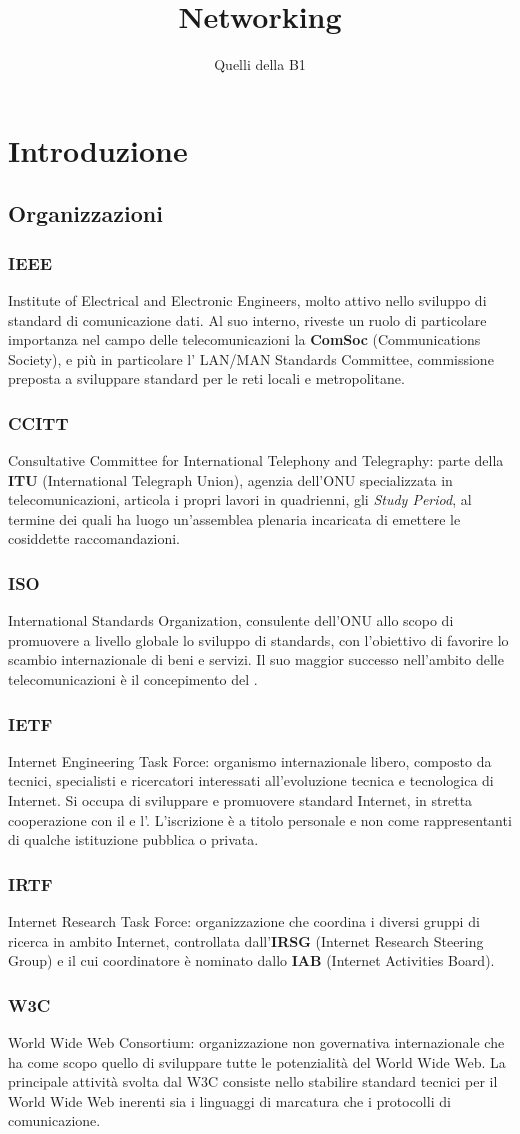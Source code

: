 \documentclass[a4paper,11pt]{article}
\author{Quelli della B1}
\title{Networking}
\def\sub#1{\subsection{#1}\label{#1}}
\def\subsub#1{\subsubsection{#1}\label{#1}}
\def\vedi#1{\nameref{#1}}
\begin{document}
\maketitle
\newpage
\tableofcontents
\newpage

\section*{Introduzione}
\sub{Organizzazioni}
\subsub{IEEE}
Institute of Electrical and Electronic Engineers, molto attivo nello sviluppo di standard di comunicazione dati. Al suo interno, riveste un ruolo di particolare importanza nel campo delle telecomunicazioni la \textbf{ComSoc} (Communications Society), e più in particolare l'\vedi{IEEE 802} LAN/MAN Standards Committee, commissione preposta a sviluppare standard per le reti locali e metropolitane. 
\subsub{CCITT}
Consultative Committee for International Telephony and Telegraphy: parte della \textbf{ITU} (International Telegraph Union), agenzia dell'ONU specializzata in telecomunicazioni, articola i propri lavori in quadrienni, gli \textit{Study Period}, al termine dei quali ha luogo un’assemblea plenaria incaricata di emettere le cosiddette raccomandazioni.
\subsub{ISO}
International Standards Organization, consulente dell'ONU allo scopo di promuovere a livello globale lo sviluppo di standards, con l’obiettivo di favorire lo scambio internazionale di beni e servizi. Il suo maggior successo nell'ambito delle telecomunicazioni è il concepimento del \vedi{Modello di riferimento ISO/OSI}.
\subsub{IETF}
Internet Engineering Task Force: organismo internazionale libero, composto da tecnici, specialisti e ricercatori interessati all'evoluzione tecnica e tecnologica di Internet. Si occupa di sviluppare e promuovere standard Internet, in stretta cooperazione con il \vedi{W3C} e l'\vedi{ISO}. L'iscrizione è a titolo personale e non come rappresentanti di qualche istituzione pubblica o privata. 
\subsub{IRTF}
Internet Research Task Force: organizzazione che coordina i diversi gruppi di ricerca in ambito Internet, controllata dall'\textbf{IRSG} (Internet Research Steering Group) e il cui coordinatore è nominato dallo \textbf{IAB} (Internet Activities Board).
\subsub{W3C}
World Wide Web Consortium: organizzazione non governativa internazionale che ha come scopo quello di sviluppare tutte le potenzialità del World Wide Web. La principale attività svolta dal W3C consiste nello stabilire standard tecnici per il World Wide Web inerenti sia i linguaggi di marcatura che i protocolli di comunicazione.
\end{document}
